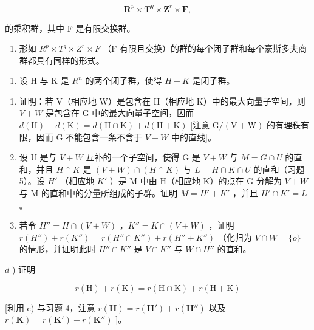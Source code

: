 \[
\mathbf {R} ^ {p} \times \mathbf {T} ^ {q} \times \mathbf {Z} ^ {r} \times \mathbf {F},
\]

的乘积群，其中 F 是有限交换群。

\begin{enumerate}
\def\labelenumi{\alph{enumi})}
\setcounter{enumi}{1}
\tightlist
\item
  形如 \(R^{p} \times T^{q} \times Z^{r} \times F\) （F 有限且交换）的群的每个闭子群和每个豪斯多夫商群都具有同样的形式。
\end{enumerate}

\begin{enumerate}
\def\labelenumi{\arabic{enumi})}
\setcounter{enumi}{5}
\tightlist
\item
  设 H 与 K 是 \(R^{n}\) 的两个闭子群，使得 \(H + K\) 是闭子群。
\end{enumerate}

\begin{enumerate}
\def\labelenumi{\alph{enumi})}
\item
  证明：若 V（相应地 W）是包含在 H（相应地 K）中的最大向量子空间，则 \(V + W\) 是包含在 G 中的最大向量子空间，因而 \(d(\mathrm{H}) + d(\mathrm{K}) = d(\mathrm{H} \cap \mathrm{K}) + d(\mathrm{H} + \mathrm{K})\) {[}注意 \(\mathrm{G}/(\mathrm{V} + \mathrm{W})\) 的有理秩有限，因而 G 不能包含一条不含于 \(V + W\) 中的直线{]}。
\item
  设 U 是与 \(V + W\) 互补的一个子空间，使得 G 是 \(V + W\) 与 \(M = G \cap U\) 的直和，并且 \(H \cap K\) 是 \((V + W) \cap (H \cap K)\) 与 \(L = H \cap K \cap U\) 的直和（习题 5）。设 \(H'\) （相应地 \(K'\) ）是 M 中由 H（相应地 K）的点在 G 分解为 \(V + W\) 与 M 的直和中的分量所组成的子群。证明 \(M = H' + K'\) ，并且 \(H' \cap K' = L\) 。
\item
  若令 \(H'' = H \cap (V + W)\) ，\(K'' = K \cap (V + W)\) ，证明 \(r(H'') + r(K'') = r(H'' \cap K'') + r(H'' + K'')\) （化归为 \(V \cap W = \{o\}\) 的情形，并证明此时 \(H'' \cap K''\) 是 \(V \cap K''\) 与 \(W \cap H''\) 的直和。
\end{enumerate}

\(d\) ) 证明

\[
r (\mathrm{H}) + r (\mathrm{K}) = r (\mathrm{H} \cap \mathrm{K}) + r (\mathrm{H} + \mathrm{K})
\]

{[}利用 c) 与习题 4，注意 \(r(\mathbf{H}) = r(\mathbf{H}') + r(\mathbf{H}'')\) 以及 \(r(\mathbf{K}) = r(\mathbf{K}') + r(\mathbf{K}'' )\) {]}。

